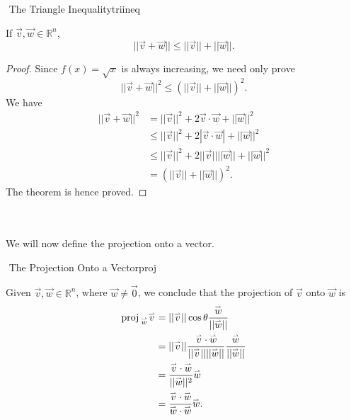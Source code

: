         \begin{theorem}{\Stop\,\,The Triangle Inequality}{triineq}
        
            If \(\vec{v},\vec{w}\in\mathbb{R}^n\),
            \begin{equation*}
                ||\vec{v}+\vec{w}||\leq||\vec{v}||+||\vec{w}||.
            \end{equation*}
            \begin{proof}
                Since \(f(x)=\sqrt{x}\) is always increasing, we need only prove
                \begin{equation*}
                    ||\vec{v}+\vec{w}||^2\leq(||\vec{v}||+||\vec{w}||)^2.
                \end{equation*}
                We have
                \begin{align*}
                    ||\vec{v}+\vec{w}||^2&=||\vec{v}||^2+2\vec{v}\cdot\vec{w}+||\vec{w}||^2 \\
                    &\leq||\vec{v}||^2+2|\vec{v}\cdot\vec{w}|+||\vec{w}||^2 \\
                    &\leq||\vec{v}||^2+2||\vec{v}||||\vec{w}||+||\vec{w}||^2 \\
                    &=(||\vec{v}||+||\vec{w}||)^2.
                \end{align*}
                The theorem is hence proved.
            \end{proof}
        
        \end{theorem}
        \pagebreak
        \vphantom
        \\
        \\
        We will now define the projection onto a vector.
        \begin{definition}{\Stop\,\,The Projection Onto a Vector}{proj}
        
            Given \(\vec{v},\vec{w}\in\mathbb{R}^n\), where \(\vec{w}\neq\vec{0}\), we conclude that the projection of \(\vec{v}\) onto \(\vec{w}\) is
            \begin{align*}
                \text{proj\,}_{\overset{_{\rightharpoonup}}{w}}{\overset{_{\rightharpoonup}}{v}}&=||\overset{_{\rightharpoonup}}{v}||\cos\theta\frac{\overset{_{\rightharpoonup}}{w}}{||\overset{_{\rightharpoonup}}{w}||} \\
                &=||\overset{_{\rightharpoonup}}{v}||\frac{\overset{_{\rightharpoonup}}{v}\cdot\overset{_{\rightharpoonup}}{w}}{||\overset{_{\rightharpoonup}}{v}||||\overset{_{\rightharpoonup}}{w}||}\frac{\overset{_{\rightharpoonup}}{w}}{||\overset{_{\rightharpoonup}}{w}||} \\
                &=\frac{\overset{_{\rightharpoonup}}{v}\cdot\overset{_{\rightharpoonup}}{w}}{||\overset{_{\rightharpoonup}}{w}||^2}\overset{_{\rightharpoonup}}{w} \\
                &=\frac{\overset{_{\rightharpoonup}}{v}\cdot\overset{_{\rightharpoonup}}{w}}{\overset{_{\rightharpoonup}}{w}\cdot\overset{_{\rightharpoonup}}{w}}\overset{_{\rightharpoonup}}{w}.
            \end{align*}
            
        \end{definition}
